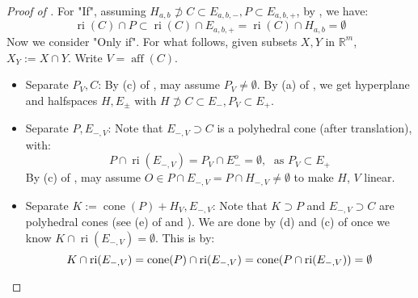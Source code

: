 \begin{proof}[Proof of ]
	For "If", assuming $H_{a,b}\nsupset C\subset E_{a,b,-},P\subset E_{a,b,+}$, by , we have:
	\[
		\operatorname{ri}(C)\cap P\subset \operatorname{ri}(C)\cap E_{a,b,+}=\operatorname{ri}(C)\cap H_{a,b}=\emptyset
	\]
	Now we consider "Only if". For what follows, given subsets $X,Y$ in $\mathbb{R}^m$, $X_Y:=X\cap Y$. Write $V=\operatorname{aff}(C)$.
	\begin{itemize}
		\item Separate $P_V,C$: By (c) of , may assume $P_V\neq\emptyset$. By (a) of , we get hyperplane and halfspaces $H,E_{\pm}$ with $H\nsupset C\subset E_-,P_V\subset E_+$.
		\item Separate $P,E_{-,V}$: Note that $E_{-,V}\supset C$ is a polyhedral cone (after translation), with:
		      \[
			      P\cap \operatorname{ri}(E_{-,V})=P_V\cap E^o_{-} =\emptyset,\;\text{ as }P_V\subset E_+
		      \]
		      By (c) of , may assume $O\in P\cap E_{-,V}=P\cap H_{-,V}\neq\emptyset$ to make $H$, $V$ linear.
		\item Separate $K:=\operatorname{cone}(P)+H_V,E_{-,V}$: Note that $K\supset P$ and $E_{-,V}\supset C$ are polyhedral cones (see (e) of  and ). We are done by (d) and (c) of  once we know $K\cap \operatorname{ri}(E_{-,V})=\emptyset$. This is by:
		      \[
			      K\cap \operatorname{ri}(E_{-,V}) = \operatorname{cone}(P) \cap \operatorname{ri}(E_{-,V}) = \operatorname{cone}(P \cap \operatorname{ri}(E_{-,V})) = \emptyset
			      \qedhere
		      \]
	\end{itemize}
\end{proof}
